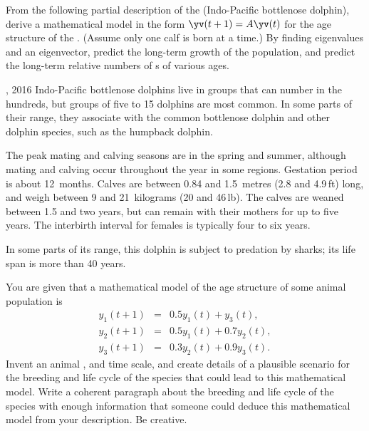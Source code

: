 \begin{exercise} \label{ex:} 
From the following partial description of the  (Indo-Pacific bottlenose dolphin), 
derive a mathematical model in the form \(\yv(t+1)=A\yv(t)\) for the age structure of the .
(Assume only one calf is born at a time.)
By finding eigenvalues and an eigenvector, predict the long-term growth of the population, and predict the long-term relative numbers of s of various ages.
\begin{quoted}{, 2016}
Indo-Pacific bottlenose dolphins live in groups that can number in the hundreds, but groups of five to 15 dolphins are most common.  In some parts of their range, they associate with the common bottlenose dolphin and other dolphin species, such as the humpback dolphin.

The peak mating and calving seasons are in the spring and summer, although mating and calving occur throughout the year in some regions. Gestation period is about 12~months. Calves are between 0.84 and 1.5~metres (2.8 and 4.9\,ft) long, and weigh between 9 and 21~kilograms (20 and 46\,lb). The calves are weaned between 1.5 and two years, but can remain with their mothers for up to five years. The interbirth interval for females is typically four to six years.

In some parts of its range, this dolphin is subject to predation by sharks; its life span is more than 40 years.
\end{quoted}
\end{exercise}






\begin{exercise} \label{ex:} 
You are given that a mathematical model of the age structure of some animal population is
\begin{eqnarray*}
y_1(t+1)&=& 0.5y_1(t)+y_3(t),\\
y_2(t+1)&=& 0.5y_1(t)+0.7y_2(t),\\
y_3(t+1)&=& 0.3y_2(t)+0.9y_3(t).
\end{eqnarray*}
Invent an animal , and time scale, and create details of a plausible scenario for the breeding and life cycle of the species that could lead to this mathematical model.  
Write a coherent paragraph about the breeding and life cycle of the species with enough information that someone could deduce this mathematical model from your description.  
Be creative.
\end{exercise}











